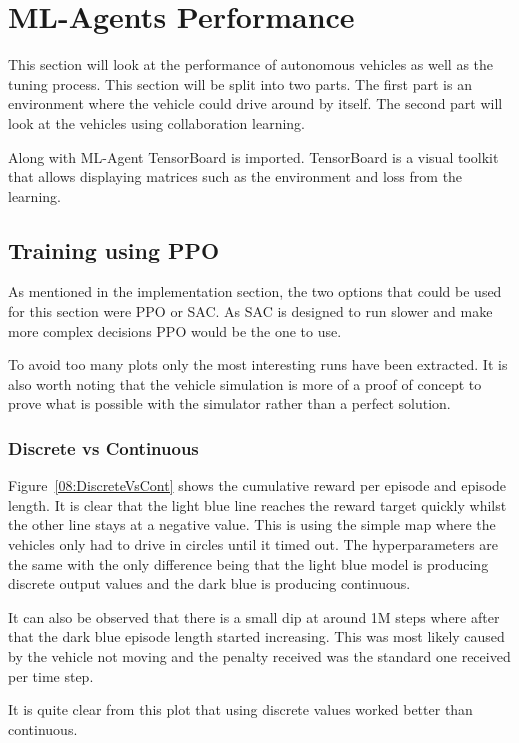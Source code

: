 \section{ML-Agents Performance} \label{MLPreformance}
This section will look at the performance of autonomous vehicles as well as the tuning process. This section will be split into two parts. The first part is an environment where the vehicle could drive around by itself. The second part will look at the vehicles using collaboration learning. 

Along with ML-Agent TensorBoard is imported. TensorBoard is a visual toolkit that allows displaying matrices such as the environment and loss from the learning.  

\subsection{Training using PPO}
As mentioned in the implementation section, the two options that could be used for this section were PPO or SAC. As SAC is designed to run slower and make more complex decisions PPO would be the one to use. 

To avoid too many plots only the most interesting runs have been extracted. It is also worth noting that the vehicle simulation is more of a proof of concept to prove what is possible with the simulator rather than a perfect solution. 

\subsubsection{Discrete vs Continuous}

Figure~\ref{08:DiscreteVsCont} shows the cumulative reward per episode and episode length. It is clear that the light blue line reaches the reward target quickly whilst the other line stays at a negative value. This is using the simple map where the vehicles only had to drive in circles until it timed out. The hyperparameters are the same with the only difference being that the light blue model is producing discrete output values and the dark blue is producing continuous. 

It can also be observed that there is a small dip at around 1M steps where after that the dark blue episode length started increasing. This was most likely caused by the vehicle not moving and the penalty received was the standard one received per time step. 

It is quite clear from this plot that using discrete values worked better than continuous. 


